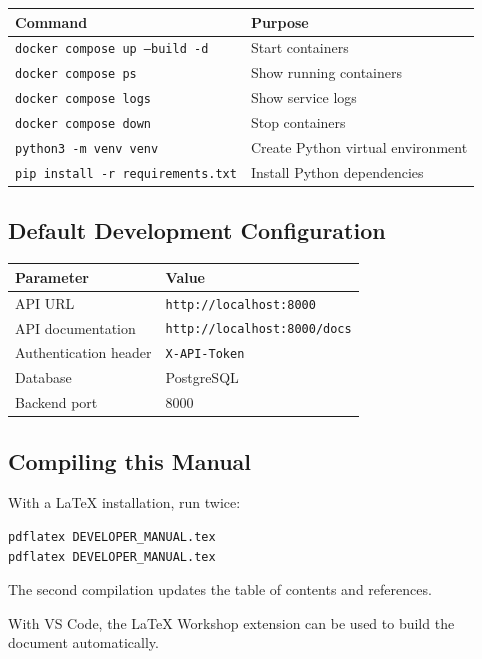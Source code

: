 \documentclass[12pt,a4paper]{article}
\begin{document}
\begin{longtable}{p{8cm}p{6cm}}
\toprule
\textbf{Command} & \textbf{Purpose}\\
\midrule
\endhead
\texttt{docker compose up --build -d} & Start containers\\
\texttt{docker compose ps} & Show running containers\\
\texttt{docker compose logs} & Show service logs\\
\texttt{docker compose down} & Stop containers\\
\texttt{python3 -m venv venv} & Create Python virtual environment\\
\texttt{pip install -r requirements.txt} & Install Python dependencies\\
\bottomrule
\end{longtable}

\subsection{Default Development Configuration}

\begin{longtable}{p{6cm}p{8cm}}
\toprule
\textbf{Parameter} & \textbf{Value}\\
\midrule
\endhead
API URL & \texttt{http://localhost:8000}\\
API documentation & \texttt{http://localhost:8000/docs}\\
Authentication header & \texttt{X-API-Token}\\
Database & PostgreSQL\\
Backend port & 8000\\
\bottomrule
\end{longtable}

\subsection{Compiling this Manual}

With a LaTeX installation, run twice:

\begin{lstlisting}[language=bash]
pdflatex DEVELOPER_MANUAL.tex
pdflatex DEVELOPER_MANUAL.tex
\end{lstlisting}

The second compilation updates the table of contents and references.

With VS Code, the LaTeX Workshop extension can be used to build the
document automatically.

\end{document}
